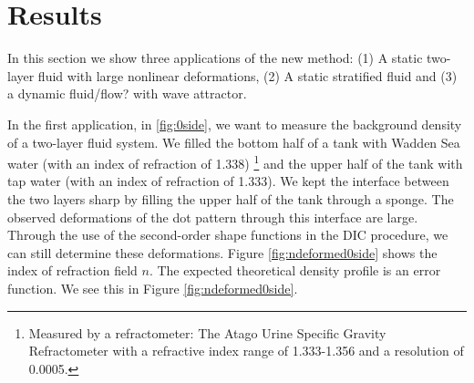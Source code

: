 \documentclass{article}
\begin{document}
\section{Results}
In this section we show three applications of the new method: (1) A static two-layer fluid with large nonlinear deformations, (2) A static stratified fluid and (3) a dynamic fluid/flow? with wave attractor.

In the first application, in \ref{fig:0side}, we want to measure the background density of a two-layer fluid system. We filled the bottom half of a tank with Wadden Sea water (with an index of refraction of 1.338) \footnote{Measured by a refractometer: The Atago Urine Specific Gravity Refractometer with a refractive index range of 1.333-1.356 and a resolution of 0.0005.} and the upper half of the tank with tap water (with an index of refraction of 1.333). We kept the interface between the two layers sharp by filling the upper half of the tank through a sponge. The observed deformations of the dot pattern through this interface are large. Through the use of the second-order shape functions in the DIC procedure, we can still determine these deformations. Figure \ref{fig:ndeformed0side} shows the index of refraction field $n$. The expected theoretical density profile is an error function. We see this in Figure \ref{fig:ndeformed0side}.
\end{document}
